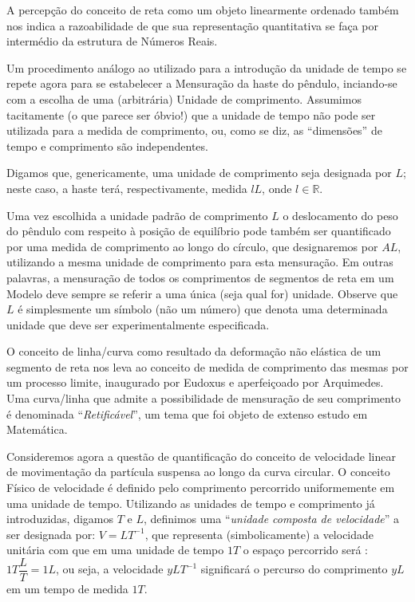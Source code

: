     A percepção do conceito de reta como um objeto linearmente ordenado também nos indica a razoabilidade de que sua representação quantitativa se faça por intermédio da estrutura de Números Reais.

    Um procedimento análogo ao utilizado para a introdução da unidade de tempo se repete agora para se estabelecer a Mensuração da haste do pêndulo, inciando-se com a escolha de uma (arbitrária) Unidade de comprimento. Assumimos tacitamente (o que parece ser óbvio!) que a unidade de tempo não pode ser utilizada para a medida de comprimento, ou, como se diz, as ``dimensões'' de tempo e comprimento são independentes.

    Digamos que, genericamente, uma unidade de comprimento seja designada por \(L\); neste caso, a haste terá, respectivamente, medida \(lL\), onde \(l \in \mathbb{R}\).

    Uma vez escolhida a unidade padrão de comprimento \(L\) o deslocamento do peso do pêndulo com respeito à posição de equilíbrio pode também ser quantificado por uma medida de comprimento ao longo do círculo, que designaremos por \(AL\), utilizando a mesma unidade de comprimento para esta mensuração. Em outras palavras, a mensuração de todos os comprimentos de segmentos de reta em um Modelo deve sempre se referir a uma única (seja qual for) unidade. Observe que \(L\) é simplesmente um símbolo (não um número) que denota uma determinada unidade que deve ser experimentalmente especificada.

    O conceito de linha/curva como resultado da deformação não elástica de um segmento de reta nos leva ao conceito de medida de comprimento das mesmas por um processo limite, inaugurado por Eudoxus e aperfeiçoado por Arquimedes. Uma curva/linha que admite a possibilidade de mensuração de seu comprimento é denominada ``\textit{Retificável}'', um tema que foi objeto de extenso estudo em Matemática.

    Consideremos agora a questão de quantificação do conceito de velocidade linear de movimentação da partícula suspensa ao longo da curva circular. O conceito Físico de velocidade é definido pelo comprimento percorrido uniformemente em uma unidade de tempo. Utilizando as unidades de tempo e comprimento já introduzidas, digamos \(T\) e \(L\), definimos uma ``\textit{unidade composta de velocidade}'' a ser designada por: \(V = LT^{-1}\), que representa (simbolicamente) a velocidade unitária com que em uma unidade de tempo \(1T\) o espaço percorrido será : \(1T\dfrac{L}{T} = 1L\), ou seja, a velocidade \(yLT^{-1}\) significará o percurso do comprimento \(yL\) em um tempo de medida \(1T\).

